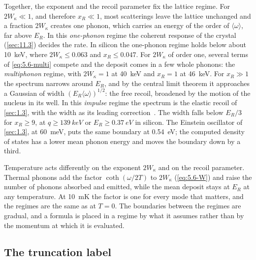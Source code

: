 Together, the exponent and the recoil parameter fix the lattice regime. For $2W_\kappa \ll 1$, and therefore $x_R \ll 1$, most scatterings leave the lattice unchanged and a fraction $2W_\kappa$ creates one phonon, which carries an energy of the order of $\langle\omega\rangle$, far above $E_R$. In this \emph{one-phonon} regime the coherent response of the crystal (\cref{sec:11.3}) decides the rate. In silicon the one-phonon regime holds below about \SI{10}{keV}, where $2W_\kappa \le 0.063$ and $x_R \le 0.047$. For $2W_\kappa$ of order one, several terms of \cref{eq:5.6-multi} compete and the deposit comes in a few whole phonons: the \emph{multiphonon} regime, with $2W_\kappa = 1$ at \SI{40}{keV} and $x_R = 1$ at \SI{46}{keV}. For $x_R \gg 1$ the spectrum narrows around $E_R$, and by the central limit theorem it approaches a Gaussian of width $(E_R\langle\omega\rangle)^{1/2}$: the free recoil, broadened by the motion of the nucleus in its well. In this \emph{impulse} regime the spectrum is the elastic recoil of \cref{sec:1.3}, with the width as its leading correction~\cite[Sect.~IV\,A, Eqs.~(90)--(92)]{kahn2022searches}. The width falls below $E_R/3$ for $x_R \ge 9$, at $q \ge \SI{139}{keV}$ or $E_R \ge \SI{0.37}{eV}$ in silicon. The Einstein oscillator of \cref{sec:1.3}, at \SI{60}{meV}, puts the same boundary at \SI{0.54}{eV}; the computed density of states has a lower mean phonon energy and moves the boundary down by a third.

Temperature acts differently on the exponent $2W_\kappa$ and on the recoil parameter. Thermal phonons add the factor $\coth(\omega/2T)$ to $2W_\kappa$ (\cref{eq:5.6-W}) and raise the number of phonons absorbed and emitted, while the mean deposit stays at $E_R$ at any temperature. At \SI{10}{mK} the factor is one for every mode that matters, and the regimes are the same as at $T = 0$. The boundaries between the regimes are gradual, and a formula is placed in a regime by what it assumes rather than by the momentum at which it is evaluated.

\subsection{The truncation label}

